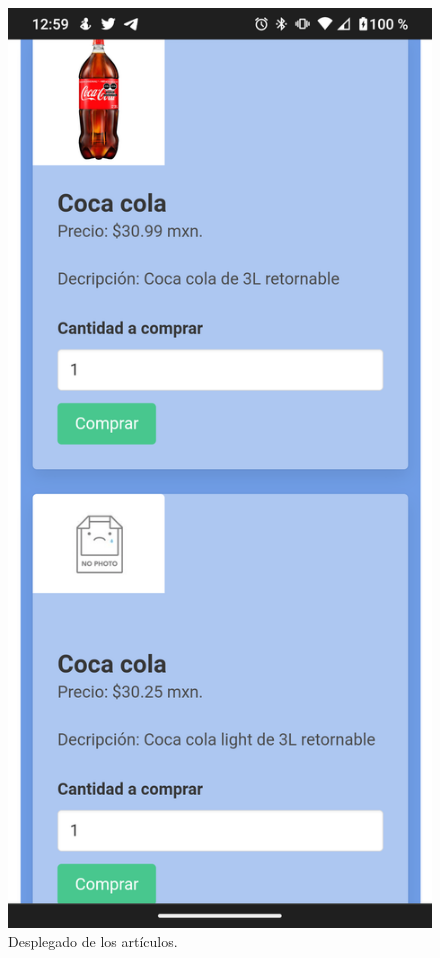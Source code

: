 \documentclass[11pt]{article}
\begin{document}
		\begin{figure}[H]
			\centering
			\includegraphics[scale=0.27]{resources/Screenshot_20211113-005930.png}
			\caption{Desplegado de los artículos.}\label{fig:picture}
		\end{figure}
\end{document}
